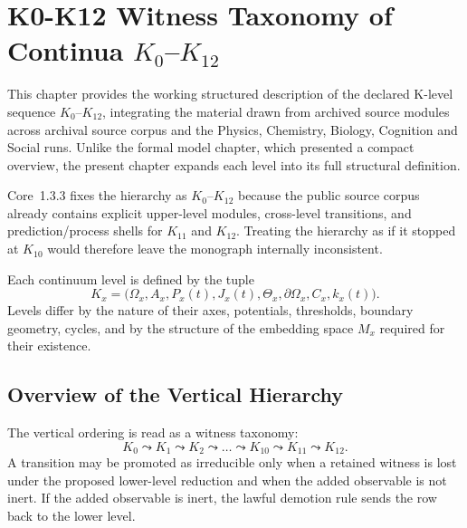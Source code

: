 
\section{K0-K12 Witness Taxonomy of Continua \texorpdfstring{\texorpdfstring{$K_0$}{K\_0}–$K_{12}$}{K0–K12}}
\label{sec:klevels-full}

This chapter provides the working structured description of the declared K-level sequence \(K_0\)–\(K_{12}\), integrating the material drawn from archived source modules across archival source corpus and the Physics, Chemistry, Biology, Cognition
and Social runs.
Unlike the formal model chapter, which presented a compact overview, the
present chapter expands each level into its full structural definition.

Core~1.3.3 fixes the hierarchy as \(K_0\)–\(K_{12}\) because the public source
corpus already contains explicit upper-level modules, cross-level transitions,
and prediction/process shells for \(K_{11}\) and \(K_{12}\).
Treating the hierarchy as if it stopped at \(K_{10}\) would therefore leave the
monograph internally inconsistent.

Each continuum level is defined by the tuple
\[
    K_x = \big(\Omega_x, A_x, P_x(t), J_x(t), \Theta_x,
           \partial\Omega_x, C_x, k_x(t)\big).
\]
Levels differ by the nature of their axes, potentials, thresholds,
boundary geometry, cycles, and by the structure of the embedding space
\(M_x\) required for their existence.


\subsection{Overview of the Vertical Hierarchy}

The vertical ordering is read as a witness taxonomy:
\[
    K_0 \leadsto K_1 \leadsto K_2 \leadsto \dots
    \leadsto K_{10} \leadsto K_{11} \leadsto K_{12}.
\]
A transition may be promoted as irreducible only when a retained witness is lost under the proposed lower-level reduction and when the added observable is not inert. If the added observable is inert, the lawful demotion rule sends the row back to the lower level.

